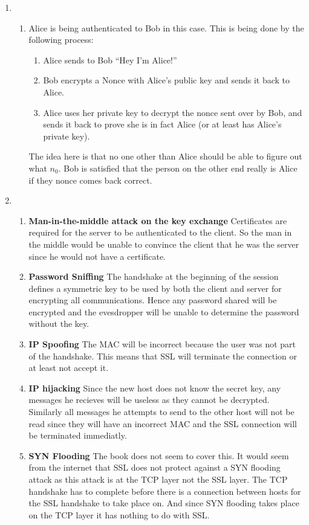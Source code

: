 \documentclass{article}
\begin{document}
\begin{enumerate}
  \item
    \begin{enumerate}

      \item
        Alice is being authenticated to Bob in this case. This is being done by the following process:
      \begin{enumerate}
        \item Alice sends to Bob ``Hey I'm Alice!''
        \item Bob encrypts a Nonce with Alice's public key and sends it back to Alice.
        \item Alice uses her private key to decrypt the nonce sent over by Bob, and sends it back to prove she is in fact Alice (or at least has Alice's private key).
      \end{enumerate}

      The idea here is that no one other than Alice should be able to figure out what $n_0$. Bob is satisfied that the person on the other end really is Alice if they nonce comes back correct.
    \end{enumerate}
    
  \item
    \begin{enumerate}
    \item 
      {\bf Man-in-the-middle attack on the key exchange} Certificates are required for the server to be authenticated to the client. So the man in the middle would be unable to convince the client that he was the server since he would not have a certificate.
    \item
      {\bf Password Sniffing} The handshake at the beginning of the session defines a symmetric key to be used by both the client and server for encrypting all communications. Hence any password shared will be encrypted and the evesdropper will be unable to determine the password without the key.
    \item
      {\bf IP Spoofing} The MAC will be incorrect because the user was not part of the handshake. This means that SSL will terminate the connection or at least not accept it.
    \item
      {\bf IP hijacking} Since the new host does not know the secret key, any messages he recieves will be useless as they cannot be decrypted. Similarly all messages he attempts to send to the other host will not be read since they will have an incorrect MAC and the SSL connection will be terminated immediatly.
    \item
      {\bf SYN Flooding} The book does not seem to cover this. It would seem from the internet that SSL does not protect against a SYN flooding attack as this attack is at the TCP layer not the SSL layer. The TCP handshake has to complete before there is a connection between hosts for the SSL handshake to take place on. And since SYN flooding takes place on the TCP layer it has nothing to do with SSL.
      

\end{enumerate}
\end{enumerate}
\end{document}
